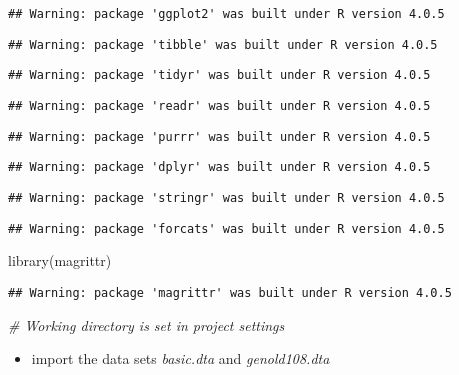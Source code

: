 \documentclass[
]{article}
\newenvironment{Shaded}{\begin{snugshade}}{\end{snugshade}}
\newcommand{\CommentTok}[1]{\textcolor[rgb]{0.56,0.35,0.01}{\textit{#1}}}
\newcommand{\FunctionTok}[1]{\textcolor[rgb]{0.00,0.00,0.00}{#1}}
\newcommand{\NormalTok}[1]{#1}
\providecommand{\tightlist}{%
  \setlength{\itemsep}{0pt}\setlength{\parskip}{0pt}}
\begin{document}
\begin{verbatim}
## Warning: package 'ggplot2' was built under R version 4.0.5
\end{verbatim}

\begin{verbatim}
## Warning: package 'tibble' was built under R version 4.0.5
\end{verbatim}

\begin{verbatim}
## Warning: package 'tidyr' was built under R version 4.0.5
\end{verbatim}

\begin{verbatim}
## Warning: package 'readr' was built under R version 4.0.5
\end{verbatim}

\begin{verbatim}
## Warning: package 'purrr' was built under R version 4.0.5
\end{verbatim}

\begin{verbatim}
## Warning: package 'dplyr' was built under R version 4.0.5
\end{verbatim}

\begin{verbatim}
## Warning: package 'stringr' was built under R version 4.0.5
\end{verbatim}

\begin{verbatim}
## Warning: package 'forcats' was built under R version 4.0.5
\end{verbatim}

\begin{Shaded}
\begin{Highlighting}[]
\FunctionTok{library}\NormalTok{(magrittr)}
\end{Highlighting}
\end{Shaded}

\begin{verbatim}
## Warning: package 'magrittr' was built under R version 4.0.5
\end{verbatim}

\begin{Shaded}
\begin{Highlighting}[]
\CommentTok{\# Working directory is set in project settings}
\end{Highlighting}
\end{Shaded}

\begin{itemize}
\tightlist
\item
  import the data sets \emph{basic.dta} and \emph{genold108.dta}
\end{itemize}
\end{document}
